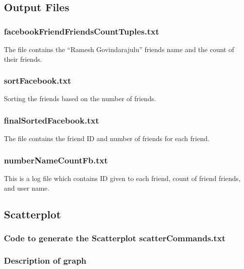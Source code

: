 \documentclass[12pt]{article}
\begin{document}
\subsection{Output Files}

\subsubsection{facebookFriendFriendsCountTuples.txt}
The file contains the ``Ramesh Govindarajulu'' friends name and the count of their friends.


\subsubsection{sortFacebook.txt}
Sorting the friends based on the number of friends.


\subsubsection{finalSortedFacebook.txt}
The file contains the friend ID and number of friends for each friend.


\subsubsection{numberNameCountFb.txt}
This is a log file which contains ID given to each friend, count of friend friends, and  user name.

\newpage


\subsection{Scatterplot}
\subsubsection{Code to generate the Scatterplot scatterCommands.txt}

\subsubsection{Description of graph}
\end{document}
